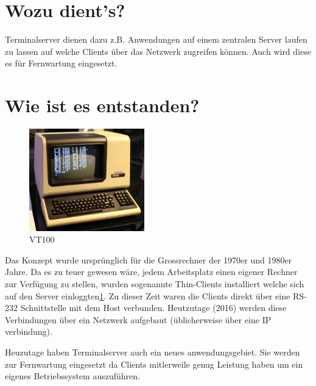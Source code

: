 \documentclass[11pt,twoside,a4paper]{article}
\title{\textbf{\titleText}}
\author{\authorText}
\date{\dateText}
\begin{document}
	\maketitle
	\tableofcontents
\clearpage
	\section{Wozu dient's?}
        \begin{multicols}{2}
          Terminalserver dienen dazu z.B. Anwendungen auf einem zentralen Server laufen zu lassen auf welche Clients über das Netzwerk zugreifen können. Auch wird diese es für Fernwartung eingesetzt. 
	\end{multicols}
	\section{Wie ist es entstanden?}
	\begin{figure}
          \label{fig:term}
          \centering
          \includegraphics[width=5cm]{terminal}
          \caption{VT100 }
        \end{figure}

        \begin{multicols}{2}
          Das Konzept wurde ursprünglich für die Grossrechner der 1970er und
          1980er Jahre. Da es zu teuer gewesen wäre, jedem Arbeitsplatz einen
          eigener Rechner zur Verfügung zu stellen, wurden sogenannte
          Thin-Clients installiert welche sich auf den Server
          einloggten\ref{fig:term}. Zu dieser Zeit waren die Clients direkt
          über eine RS-232 Schnittstelle mit dem Host verbunden. Heutzutage
          (2016) werden diese Verbindungen über ein Netzwerk aufgebaut
          (üblicherweise über eine IP verbindung). 

          Heuzutage haben Terminalserver auch ein neues anwendungsgebiet. Sie werden zur Fernwartung eingesetzt da Clients mitlerweile genug Leistung haben um ein eigenes Betriebssystem auszuführen. 
	\end{multicols}
          
\end{document}
